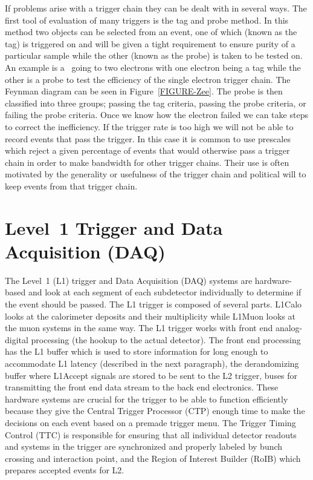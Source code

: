 If problems arise with a trigger chain they can be dealt with in several ways. The first tool of evaluation of many triggers is the tag and probe method. In this method two objects can be selected from an event, one of which (known as the tag) is triggered on and will be given a tight requirement to ensure purity of a particular sample while the other (known as the probe) is taken to be tested on. An example is a \az~going to two electrons with one electron being a tag while the other is a probe to test the efficiency of the single electron trigger chain. The Feynman diagram can be seen in Figure~\ref{FIGURE-Zee}. The probe is then classified into three groups; passing the tag criteria, passing the probe criteria, or failing the probe criteria. Once we know how the electron failed we can take steps to correct the inefficiency. If the trigger rate is too high we will not be able to record events that pass the trigger. In this case it is common to use prescales which reject a given percentage of events that would otherwise pass a trigger chain in order to make bandwidth for other trigger chains. Their use is often motivated by the generality or usefulness of the trigger chain and political will to keep events from that trigger chain.



\section{Level~1 Trigger and Data Acquisition (DAQ)}
\label{SECTION-TRIGGERS-L1}

The Level~1 (L1) trigger and Data Acquisition (DAQ) systems are hardware-based and look at each segment of each subdetector individually to determine if the event should be passed. The L1 trigger is composed of several parts. L1Calo looks at the calorimeter deposits and their multiplicity while L1Muon looks at the muon systems in the same way. The L1 trigger works with front end analog-digital processing (the hookup to the actual detector). The front end processing has the L1 buffer which is used to store information for long enough to accommodate L1 latency (described in the next paragraph), the derandomizing buffer where L1Accept signals are stored to be sent to the L2 trigger, buses for transmitting the front end data stream to the back end electronics. These hardware systems are crucial for the trigger to be able to function efficiently because they give the Central Trigger Processor (CTP) enough time to make the decisions on each event based on a premade trigger menu. The Trigger Timing Control (TTC) is responsible for ensuring that all individual detector readouts and systems in the trigger are synchronized and properly labeled by bunch crossing and interaction point, and the Region of Interest Builder (RoIB) which prepares accepted events for L2. 

